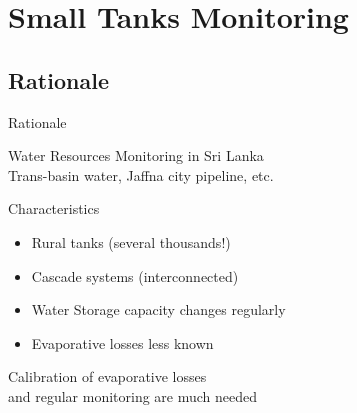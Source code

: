 \documentclass[xcolor=dvipsnames,beamer]{beamer} %
\begin{document}
\section{Small Tanks Monitoring}
\subsection{Rationale}
\begin{frame}[fragile]{Rationale}

Water Resources Monitoring in Sri Lanka\\
Trans-basin water, Jaffna city pipeline, etc.
\vspace{5mm}
\begin{block}{Characteristics}
\begin{itemize}
 \item Rural tanks (several thousands!)
 \item Cascade systems (interconnected)
 \item Water Storage capacity changes regularly
 \item Evaporative losses less known
\end{itemize}
\vspace{5mm}
Calibration of evaporative losses\\
and regular monitoring are much needed

\end{block}
\end{frame}
\end{document}
